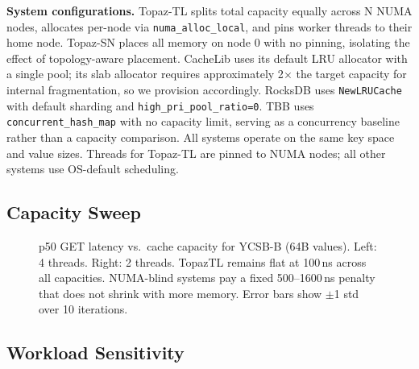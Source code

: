 \documentclass[sigplan,10pt]{acmart}
\begin{document}
\textbf{System configurations.}
Topaz-TL splits total capacity equally across N NUMA nodes, allocates per-node via \texttt{numa\_alloc\_local}, and pins worker threads to their home node.
Topaz-SN places all memory on node 0 with no pinning, isolating the effect of topology-aware placement.
CacheLib uses its default LRU allocator with a single pool; its slab allocator requires approximately 2$\times$ the target capacity for internal fragmentation, so we provision accordingly.
RocksDB uses \texttt{NewLRUCache} with default sharding and \texttt{high\_pri\_pool\_ratio=0}.
TBB uses \texttt{concurrent\_hash\_map} with no capacity limit, serving as a concurrency baseline rather than a capacity comparison.
All systems operate on the same key space and value sizes.
Threads for Topaz-TL are pinned to NUMA nodes; all other systems use OS-default scheduling.

\subsection{Capacity Sweep}
\label{sec:eval:capacity}

\begin{figure}[!ht]
\centering
\resizebox{\columnwidth}{!}{}
\caption{p50 GET latency vs.\ cache capacity for YCSB-B (64B values).
  Left: 4 threads. Right: 2 threads.
  TopazTL remains flat at 100\,ns across all capacities.
  NUMA-blind systems pay a fixed 500--1600\,ns penalty that does not shrink with more memory.
  Error bars show $\pm$1 std over 10 iterations.}
\label{fig:capacity}
\end{figure}

%
%
%

\subsection{Workload Sensitivity}
\label{sec:eval:workload}
\end{document}
